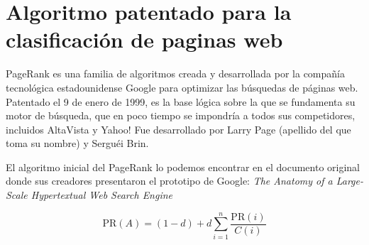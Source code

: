 \section{Algoritmo patentado para la clasificación de paginas web} %
\label{sub:Algoritmo patentado para la clasificacion de paginas web}


PageRank es una familia de algoritmos creada y desarrollada por la compañía tecnológica estadounidense Google para optimizar las búsquedas de páginas web. Patentado el 9 de enero de 1999, es la base lógica sobre la que se fundamenta su motor de búsqueda, que en poco tiempo se impondría a todos sus competidores, incluidos AltaVista y Yahoo! Fue desarrollado por Larry Page (apellido del que toma su nombre) y Serguéi Brin.

El algoritmo inicial del PageRank lo podemos encontrar en el documento original donde sus creadores presentaron el prototipo de Google: \textit{The Anatomy of a Large-Scale Hypertextual Web Search Engine}

\[
  \text{PR}(A) = (1-d) + d \displaystyle\sum_{i=1}^{n}\frac{\text{PR}(i)}{C(i)}
\]
